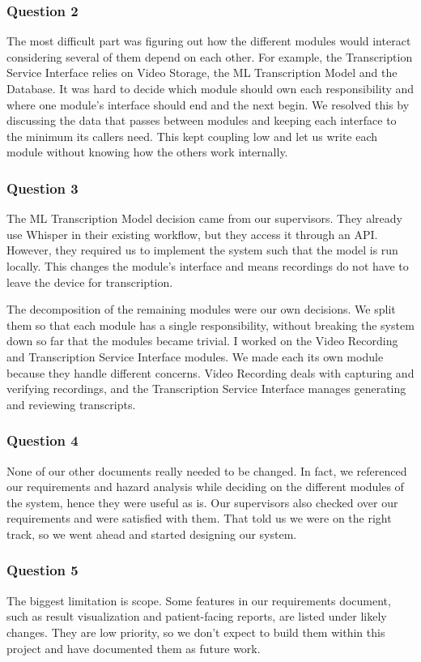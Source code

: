 \documentclass[12pt, titlepage]{article}
\begin{document}
\begin{enumerate}
\subsubsection*{Question 2}
The most difficult part was figuring out how the different modules would interact considering several of them depend on each other. 
For example, the Transcription Service Interface relies on Video Storage, the ML Transcription Model and the Database. 
It was hard to decide which module should own each responsibility and where one module’s interface should end and the next begin. 
We resolved this by discussing the data that passes between modules and keeping each interface to the minimum its callers need. 
This kept coupling low and let us write each module without knowing how the others work internally.
\subsubsection*{Question 3}
The ML Transcription Model decision came from our supervisors. 
They already use Whisper in their existing workflow, but they access it through an API. However, they required us to implement the system such that the model is run locally. 
This changes the module’s interface and means recordings do not have to leave the device for transcription.

The decomposition of the remaining modules were our own decisions. 
We split them so that each module has a single responsibility, without breaking the system down so far that the modules became trivial. 
I worked on the Video Recording and Transcription Service Interface modules. 
We made each its own module because they handle different concerns. 
Video Recording deals with capturing and verifying recordings, and the Transcription Service Interface manages generating and reviewing transcripts.
\subsubsection*{Question 4}
None of our other documents really needed to be changed. 
In fact, we referenced our requirements and hazard analysis while deciding on the different modules of the system, hence they were useful as is. 
Our supervisors also checked over our requirements and were satisfied with them. 
That told us we were on the right track, so we went ahead and started designing our system.
\subsubsection*{Question 5}
The biggest limitation is scope. 
Some features in our requirements document, such as result visualization and patient-facing reports, are listed under likely changes. 
They are low priority, so we don’t expect to build them within this project and have documented them as future work. 


\end{enumerate}
\end{document}
